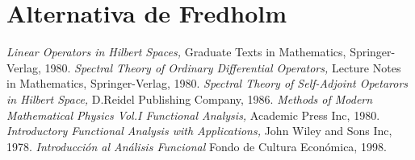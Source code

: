 \documentclass[letterpaper]{report}
\begin{document}

\section{Alternativa de Fredholm}


\begin{thebibliography}{99} 
 {\it Linear Operators in Hilbert Spaces,}
Graduate Texts in Mathematics, Springer-Verlag, 1980.
 {\it Spectral Theory of Ordinary Differential Operators,}
Lecture Notes in Mathematics, Springer-Verlag, 1980.
 {\it Spectral Theory of Self-Adjoint Opetarors in Hilbert Space,} D.Reidel Publishing Company, 1986.
 {\it Methods of Modern Mathematical Physics Vol.I Functional Analysis,} Academic Press Inc, 1980.
 { \it Introductory Functional Analysis with Applications,} John Wiley and Sons Inc, 1978.
 {\it Introducción al Análisis Funcional} Fondo de Cultura Económica, 1998.

\end{thebibliography}
\printindex
\end{document}
